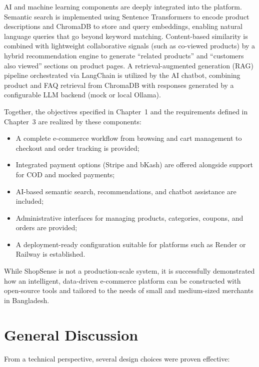 AI and machine learning components are deeply integrated into the platform. Semantic search is implemented using Sentence Transformers to encode product descriptions and ChromaDB to store and query embeddings, enabling natural language queries that go beyond keyword matching. Content-based similarity is combined with lightweight collaborative signals (such as co-viewed products) by a hybrid recommendation engine to generate “related products” and “customers also viewed” sections on product pages. A retrieval-augmented generation (RAG) pipeline orchestrated via LangChain is utilized by the AI chatbot, combining product and FAQ retrieval from ChromaDB with responses generated by a configurable LLM backend (mock or local Ollama).

Together, the objectives specified in Chapter~1 and the requirements defined in Chapter~3 are realized by these components:

\begin{itemize}
  \item A complete e-commerce workflow from browsing and cart management to checkout and order tracking is provided;
  \item Integrated payment options (Stripe and bKash) are offered alongside support for COD and mocked payments;
  \item AI-based semantic search, recommendations, and chatbot assistance are included;
  \item Administrative interfaces for managing products, categories, coupons, and orders are provided;
  \item A deployment-ready configuration suitable for platforms such as Render or Railway is established.
\end{itemize}

While ShopSense is not a production-scale system, it is successfully demonstrated how an intelligent, data-driven e-commerce platform can be constructed with open-source tools and tailored to the needs of small and medium-sized merchants in Bangladesh.

\section{General Discussion}

From a technical perspective, several design choices were proven effective:

